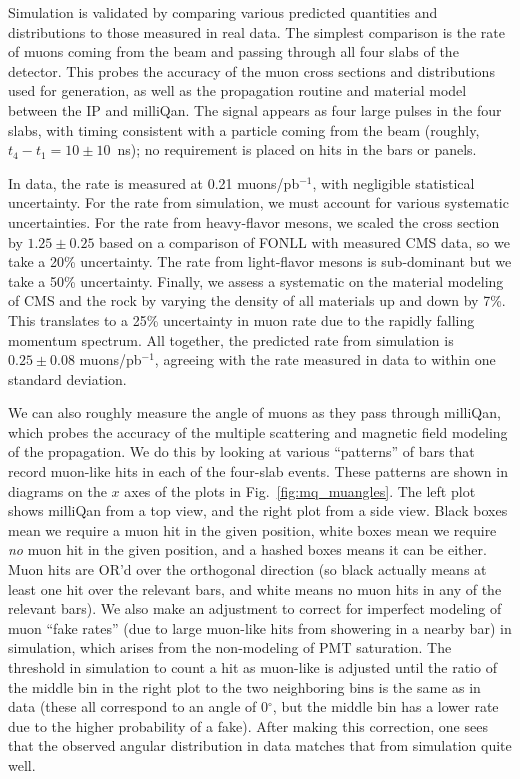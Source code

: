 {Simulation is validated by comparing various predicted quantities and distributions
to those measured in real data. The simplest comparison is the rate of muons coming
from the beam and passing through all four slabs of the detector. This probes the accuracy
of the muon cross sections and \pt distributions used for generation,
as well as the propagation routine and material model between the IP and milliQan.
The signal appears as four large pulses in the four slabs, with timing consistent
with a particle coming from the beam (roughly, $t_4-t_1=10\pm10$~ns); no requirement is
placed on hits in the bars or panels.

In data, the rate is measured at 0.21 muons/pb$^{-1}$, with negligible statistical
uncertainty. For the rate from simulation, we must account for various systematic
uncertainties. For the rate from heavy-flavor mesons, we scaled the cross section
by $1.25\pm0.25$ based on a comparison of FONLL with measured CMS data, so we take
a 20\% uncertainty. The rate from light-flavor mesons is sub-dominant but we take a
50\% uncertainty. Finally, we assess a systematic on the material modeling
of CMS and the rock by varying the density of all materials up and down by 7\%.
This translates to a 25\% uncertainty in muon rate due to the rapidly falling
momentum spectrum. All together, the predicted rate from simulation is
$0.25\pm0.08$ muons/pb$^{-1}$, agreeing with the rate measured in data
to within one standard deviation.

We can also roughly measure the angle of muons as they pass through milliQan,
which probes the accuracy of the multiple scattering and magnetic field modeling
of the propagation. We do this by looking at various ``patterns'' of bars
that record muon-like hits in each of the four-slab events. These patterns are shown
in diagrams on the $x$ axes of the plots in Fig.~\ref{fig:mq_muangles}. The left plot shows
milliQan from a top view, and the right plot from a side view. Black boxes mean we require
a muon hit in the given position, white boxes mean we require \textit{no} muon hit
in the given position, and a hashed boxes means it can be either. Muon hits are OR'd
over the orthogonal direction (so black actually means at least one hit over the relevant
bars, and white means no muon hits in any of the relevant bars).
We also make an adjustment to correct for imperfect modeling of muon ``fake rates''
(due to large muon-like hits from showering in a nearby bar) in simulation, which 
arises from the non-modeling of PMT saturation. The \Npe threshold in simulation
to count a hit as muon-like is adjusted until the ratio of the middle bin in the right
plot to the two neighboring bins is the same as in data (these all correspond to 
an angle of 0$^\circ$, but the middle bin has a lower rate due to the higher probability of a fake).
After making this correction, one sees that the observed angular distribution in data matches that
from simulation quite well. 

}
